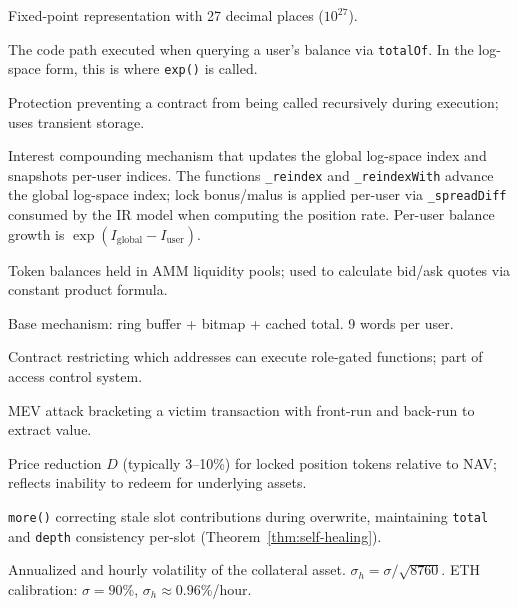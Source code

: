 \documentclass[10pt,a4paper,twocolumn]{article}
\begin{document}
\begin{description}[style=nextline, leftmargin=2.5em, labelindent=0em, font=\normalfont\bfseries]
\item[Ray] Fixed-point representation with 27 decimal places ($10^{27}$).

\item[Read Path] The code path executed when querying a user's balance via \texttt{totalOf}. In the log-space form, this is where \texttt{exp()} is called.

\item[Reentrancy Guard] Protection preventing a contract from being called recursively during execution; uses transient storage.

\item[Reindex] Interest compounding mechanism that updates the global log-space index and snapshots per-user indices. The functions \texttt{\_reindex} and \texttt{\_reindexWith} advance the global log-space index; lock bonus/malus is applied per-user via \texttt{\_spreadDiff} consumed by the IR model when computing the position rate. Per-user balance growth is $\exp(I_{\text{global}} - I_{\text{user}})$.

\item[Reserves] Token balances held in AMM liquidity pools; used to calculate bid/ask quotes via constant product formula.

\item[Ring-Lock] Base mechanism: ring buffer + bitmap + cached total. 9 words per user.

\item[Role Guard] Contract restricting which addresses can execute role-gated functions; part of access control system.


\item[Sandwich Attack] MEV attack bracketing a victim transaction with front-run and back-run to extract value.

\item[Secondary Market Discount] Price reduction $D$ (typically 3--10\%) for locked position tokens relative to NAV; reflects inability to redeem for underlying assets.

\item[Self-Healing] \texttt{more()} correcting stale slot contributions during overwrite, maintaining \texttt{total} and \texttt{depth} consistency per-slot (Theorem~\ref{thm:self-healing}).

\item[$\sigma$, $\sigma_h$\,$\dagger$] Annualized and hourly volatility of the collateral asset. $\sigma_h = \sigma / \sqrt{8760}$. ETH calibration: $\sigma = 90\%$, $\sigma_h \approx 0.96\%$/hour.


\end{description}
\end{document}
